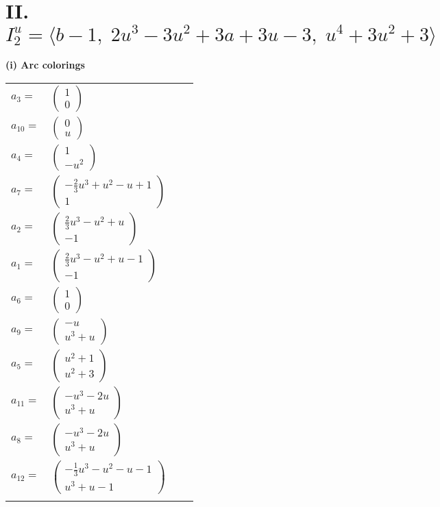 \documentclass[1p]{elsarticle_modified}
\theoremstyle{definition}
\begin{document}
\centering \section*{II. $I^u_{2}= \langle b-1,\;2 u^3-3 u^2+3 a+3 u-3,\;u^4+3 u^2+3 \rangle$}
\flushleft \textbf{(i) Arc colorings}\\
\begin{tabular}{m{7pt} m{180pt} m{7pt} m{180pt} }
\flushright $a_{3}=$&$\begin{pmatrix}1\\0\end{pmatrix}$ \\
\flushright $a_{10}=$&$\begin{pmatrix}0\\u\end{pmatrix}$ \\
\flushright $a_{4}=$&$\begin{pmatrix}1\\- u^2\end{pmatrix}$ \\
\flushright $a_{7}=$&$\begin{pmatrix}-\frac{2}{3} u^3+u^2- u+1\\1\end{pmatrix}$ \\
\flushright $a_{2}=$&$\begin{pmatrix}\frac{2}{3} u^3- u^2+u\\-1\end{pmatrix}$ \\
\flushright $a_{1}=$&$\begin{pmatrix}\frac{2}{3} u^3- u^2+u-1\\-1\end{pmatrix}$ \\
\flushright $a_{6}=$&$\begin{pmatrix}1\\0\end{pmatrix}$ \\
\flushright $a_{9}=$&$\begin{pmatrix}- u\\u^3+u\end{pmatrix}$ \\
\flushright $a_{5}=$&$\begin{pmatrix}u^2+1\\u^2+3\end{pmatrix}$ \\
\flushright $a_{11}=$&$\begin{pmatrix}- u^3-2 u\\u^3+u\end{pmatrix}$ \\
\flushright $a_{8}=$&$\begin{pmatrix}- u^3-2 u\\u^3+u\end{pmatrix}$ \\
\flushright $a_{12}=$&$\begin{pmatrix}-\frac{1}{3} u^3- u^2- u-1\\u^3+u-1\end{pmatrix}$\\&\end{tabular}
\end{document}
